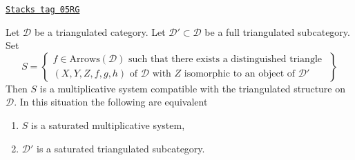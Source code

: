 \begin{lemma}
\label{derived-lemma-construct-multiplicative-system}
\href{https://stacks.math.columbia.edu/tag/05RG}{\texttt{Stacks tag 05RG}}

Let $\mathcal{D}$ be a triangulated category.
Let $\mathcal{D}' \subset \mathcal{D}$ be a full triangulated
subcategory. Set
\begin{equation}
\label{equation-multiplicative-system}
S =
\left\{
\begin{matrix}
f \in \text{Arrows}(\mathcal{D})
\text{ such that there exists a distinguished triangle }\\
(X, Y, Z, f, g, h) \text{ of }\mathcal{D}\text{ with }
Z\text{ isomorphic to an object of }\mathcal{D}'
\end{matrix}
\right\}
\end{equation}
Then $S$ is a multiplicative system compatible with the triangulated
structure on $\mathcal{D}$. In this situation the following are equivalent
\begin{enumerate}
\item $S$ is a saturated multiplicative system,
\item $\mathcal{D}'$ is a saturated triangulated subcategory.
\end{enumerate}
\end{lemma}

